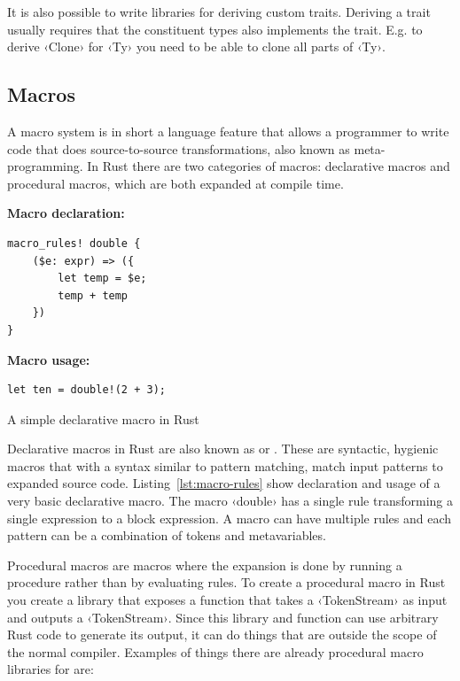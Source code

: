 It is also possible to write libraries for deriving custom traits. Deriving a trait usually requires that the constituent types also implements the trait. E.g. to derive ‹Clone› for ‹Ty› you need to be able to clone all parts of ‹Ty›.

\subsection{Macros}
\label{sec:macros}

A macro system is in short a language feature that allows a programmer to write code that does source-to-source transformations, also known as meta-programming. In Rust there are two categories of macros: declarative macros and procedural macros, which are both expanded at compile time.

\begin{listing}[ht!]
\textbf{Macro declaration:}
\begin{verbatim}
macro_rules! double {
    ($e: expr) => ({
        let temp = $e;
        temp + temp
    })
}
\end{verbatim}
\vspace{5mm}

\textbf{Macro usage:}
\begin{verbatim}
let ten = double!(2 + 3);
\end{verbatim}
\caption{A simple declarative macro in Rust}
\label{lst:macro-rules}
\end{listing}

Declarative macros in Rust are also known as  or . These are syntactic, hygienic macros that with a syntax similar to pattern matching, match input patterns to expanded source code. Listing~\ref{lst:macro-rules} show declaration and usage of a very basic declarative macro. The macro ‹double› has a single rule transforming a single expression to a block expression. A macro can have multiple rules and each pattern can be a combination of tokens and metavariables.

Procedural macros are macros where the expansion is done by running a procedure rather than by evaluating rules. To create a procedural macro in Rust you create a library that exposes a function that takes a ‹TokenStream› as input and outputs a ‹TokenStream›. Since this library and function can use arbitrary Rust code to generate its output, it can do things that are outside the scope of the normal compiler. Examples of things there are already procedural macro libraries for are:

